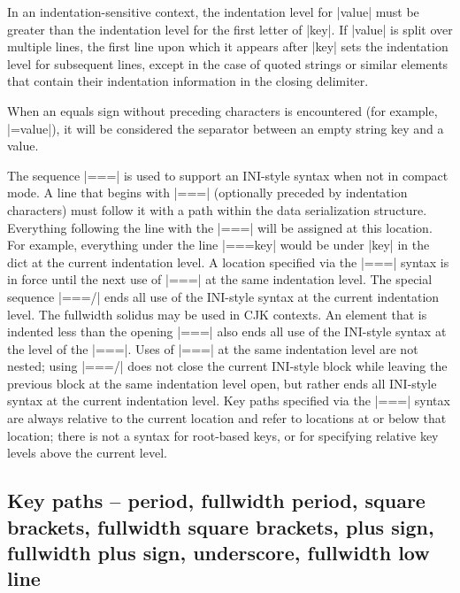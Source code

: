 \documentclass[11pt]{article}
\begin{document}
In an indentation-sensitive context, the indentation level for |value| must be greater than the indentation level for the first letter of |key|.  If |value| is split over multiple lines, the first line upon which it appears after |key| sets the indentation level for subsequent lines, except in the case of quoted strings or similar elements that contain their indentation information in the closing delimiter.

When an equals sign without preceding characters is encountered (for example, |=value|), it will be considered the separator between an empty string key and a value.  

The sequence |===| is used to support an INI-style syntax when not in compact mode.  A line that begins with |===| (optionally preceded by indentation characters) must follow it with a path within the data serialization structure.  Everything following the line with the |===| will be assigned at this location.  For example, everything under the line |===key| would be under |key| in the dict at the current indentation level.  A location specified via the |===| syntax is in force until the next use of |===| at the same indentation level.  The special sequence |===/| ends all use of the INI-style syntax at the current indentation level.  The fullwidth solidus may be used in CJK contexts.  An element that is indented less than the opening |===| also ends all use of the INI-style syntax at the level of the |===|.  Uses of |===| at the same indentation level are not nested; using |===/| does not close the current INI-style block while leaving the previous block at the same indentation level open, but rather ends all INI-style syntax at the current indentation level.  Key paths specified via the |===| syntax are always relative to the current location and refer to locations at or below that location; there is not a syntax for root-based keys, or for specifying relative key levels above the current level.


\subsection{Key paths -- period, fullwidth period, square brackets, fullwidth square brackets, plus sign, fullwidth plus sign, underscore, fullwidth low line}
\end{document}
